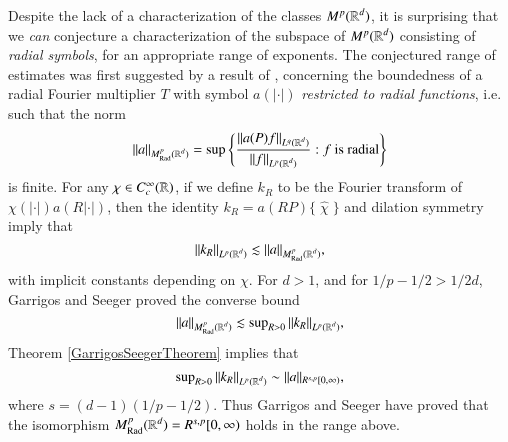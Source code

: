 Despite the lack of a characterization of the classes $M^p(\operatorname{\mathbb{R}}^d)$, it is surprising that we \emph{can} conjecture a characterization of the subspace of $M^p(\operatorname{\mathbb{R}}^d)$ consisting of \emph{radial symbols}, for an appropriate range of exponents. The conjectured range of estimates was first suggested by a result of \cite{GarrigosandSeeger}, concerning the boundedness of a radial Fourier multiplier $T$ with symbol $a(|\cdot|)$ \emph{restricted to radial functions}, i.e. such that the norm
%
\begin{equation}
  \| a \|_{M^p_{\text{Rad}}(\operatorname{\mathbb{R}}^d)} = \sup \left\{ \frac{\| a(P)f \|_{L^q(\operatorname{\mathbb{R}}^d)}}{\| f \|_{L^p(\operatorname{\mathbb{R}}^d)}} : \text{$f$ is radial} \right\}
\end{equation}
%
is finite. For any $\chi \in C_c^\infty(\operatorname{\mathbb{R}})$, if we define $k_R$ to be the Fourier transform of $\chi(|\cdot|) a(R |\cdot|)$, then the identity $k_R = a(RP) \{\;\! \widehat{\chi}\;\! \}$ and dilation symmetry imply that
%
\begin{equation}
  \| k_R \|_{L^p(\operatorname{\mathbb{R}}^d)} \lesssim \| a \|_{M^p_{\text{Rad}}(\operatorname{\mathbb{R}}^d)},
\end{equation}
%
with implicit constants depending on $\chi$. For $d > 1$, and for $1/p - 1/2 > 1/2d$, Garrigos and Seeger proved \cite{GarrigosandSeeger} the converse bound
%
\begin{equation} \label{RadialMultiplierRadialBound}
    \| a \|_{M^p_{\text{Rad}}(\operatorname{\mathbb{R}}^d)} \lesssim \sup\nolimits_{R > 0} \| k_R \|_{L^p(\operatorname{\mathbb{R}}^d)},
\end{equation}
%
Theorem \ref{GarrigosSeegerTheorem} implies that
%
\begin{equation}
  \sup\nolimits_{R > 0} \| k_R \|_{L^p(\operatorname{\mathbb{R}}^d)} \sim \| a \|_{R^{s,p}[0,\infty)},
\end{equation}
%
where $s = (d-1)(1/p - 1/2)$. Thus Garrigos and Seeger have proved that the isomorphism $M^p_{\text{Rad}}(\operatorname{\mathbb{R}}^d) = R^{s,p}[0,\infty)$ holds in the range above.


